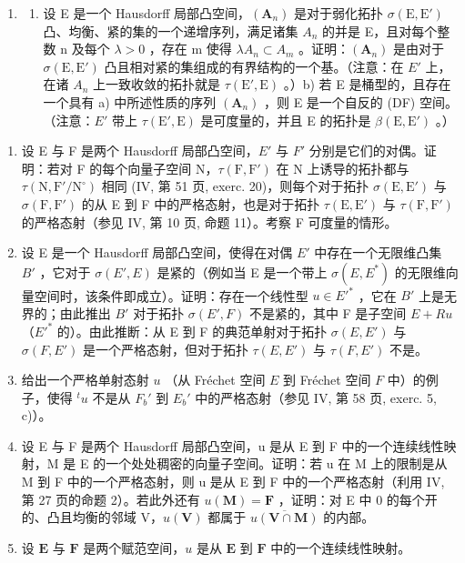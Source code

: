 \begin{enumerate}
\def\labelenumi{\arabic{enumi})}
\setcounter{enumi}{17}
\tightlist
\item
  \begin{enumerate}
  \def\labelenumii{\alph{enumii})}
  \tightlist
  \item
    设 E 是一个 Hausdorff 局部凸空间，\((\mathbf{A}_{n})\) 是对于弱化拓扑 \(\sigma(\mathrm{E}, \mathrm{E}')\) 凸、均衡、紧的集的一个递增序列，满足诸集 \(A_{n}\) 的并是 E，且对每个整数 n 及每个 \(\lambda > 0\) ，存在 m 使得 \(\lambda A_{n} \subset A_{m}\) 。证明：\((\mathbf{A}_{n})\) 是由对于 \(\sigma(\mathrm{E}, \mathrm{E}')\) 凸且相对紧的集组成的有界结构的一个基。（注意：在 \(E'\) 上，在诸 \(A_{n}\) 上一致收敛的拓扑就是 \(\tau(\mathrm{E}', \mathrm{E})\) 。）b) 若 E 是桶型的，且存在一个具有 a) 中所述性质的序列 \((\mathbf{A}_{n})\) ，则 E 是一个自反的 (DF) 空间。（注意：\(E'\) 带上 \(\tau(\mathrm{E}', \mathrm{E})\) 是可度量的，并且 E 的拓扑是 \(\beta(\mathrm{E}, \mathrm{E}')\) 。）
  \end{enumerate}
\end{enumerate}

\exercisegroup

\begin{enumerate}
\def\labelenumi{\arabic{enumi})}
\item
  设 E 与 F 是两个 Hausdorff 局部凸空间，\(E'\) 与 \(F'\) 分别是它们的对偶。证明：若对 F 的每个向量子空间 N，\(\tau(\mathrm{F}, \mathrm{F}')\) 在 N 上诱导的拓扑都与 \(\tau(\mathrm{N}, \mathrm{F}'/\mathrm{N}^{\circ})\) 相同 (IV, 第 51 页, exerc. 20)，则每个对于拓扑 \(\sigma(\mathrm{E}, \mathrm{E}')\) 与 \(\sigma(\mathrm{F}, \mathrm{F}')\) 的从 E 到 F 中的严格态射，也是对于拓扑 \(\tau(\mathrm{E}, \mathrm{E}')\) 与 \(\tau(\mathrm{F}, \mathrm{F}')\) 的严格态射（参见 IV, 第 10 页, 命题 11）。考察 F 可度量的情形。
\item
  设 E 是一个 Hausdorff 局部凸空间，使得在对偶 \(E'\) 中存在一个无限维凸集 \(B'\) ，它对于 \(\sigma(E', E)\) 是紧的（例如当 E 是一个带上 \(\sigma(E, E^{*})\) 的无限维向量空间时，该条件即成立）。证明：存在一个线性型 \(u \in E'^{*}\) ，它在 \(B'\) 上是无界的；由此推出 \(B'\) 对于拓扑 \(\sigma(E', F)\) 不是紧的，其中 F 是子空间 \(E + Ru\) （\(E'^{*}\) 的）。由此推断：从 E 到 F 的典范单射对于拓扑 \(\sigma(E, E')\) 与 \(\sigma(F, E')\) 是一个严格态射，但对于拓扑 \(\tau(E, E')\) 与 \(\tau(F, E')\) 不是。
\item
  给出一个严格单射态射 \(u\) （从 Fréchet 空间 \(E\) 到 Fréchet 空间 \(F\) 中）的例子，使得 \(^t u\) 不是从 \(F_b'\) 到 \(E_b'\) 中的严格态射（参见 IV, 第 58 页, exerc. 5, c)）。
\item
  设 E 与 F 是两个 Hausdorff 局部凸空间，u 是从 E 到 F 中的一个连续线性映射，M 是 E 的一个处处稠密的向量子空间。证明：若 u 在 M 上的限制是从 M 到 F 中的一个严格态射，则 u 是从 E 到 F 中的一个严格态射（利用 IV, 第 27 页的命题 2）。若此外还有 \(u(\mathbf{M}) = \mathbf{F}\) ，证明：对 E 中 0 的每个开的、凸且均衡的邻域 V，\(u(\mathbf{V})\) 都属于 \(\overline{u(\mathbf{V} \cap \mathbf{M})}\) 的内部。
\item
  设 \(\mathbf{E}\) 与 \(\mathbf{F}\) 是两个赋范空间，\(u\) 是从 \(\mathbf{E}\) 到 \(\mathbf{F}\) 中的一个连续线性映射。
\end{enumerate}

